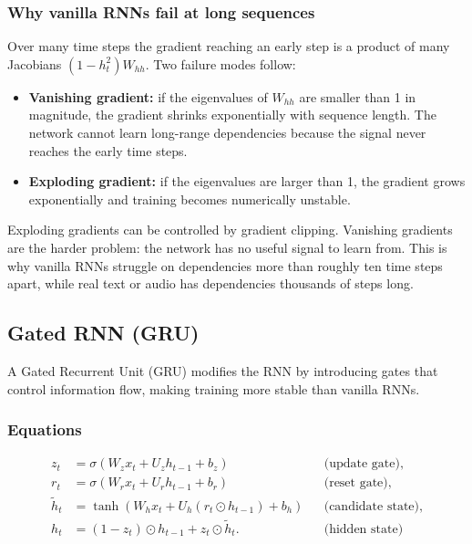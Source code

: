 \documentclass[11pt]{article}
\theoremstyle{remark}
\begin{document}
\subsubsection*{Why vanilla RNNs fail at long sequences}
Over many time steps the gradient reaching an early step is a product of many Jacobians $(1-h_t^2) W_{hh}$. Two failure modes follow:
\begin{itemize}
    \item \textbf{Vanishing gradient:} if the eigenvalues of $W_{hh}$ are smaller than 1 in magnitude, the gradient shrinks exponentially with sequence length. The network cannot learn long-range dependencies because the signal never reaches the early time steps.
    \item \textbf{Exploding gradient:} if the eigenvalues are larger than 1, the gradient grows exponentially and training becomes numerically unstable.
\end{itemize}
Exploding gradients can be controlled by gradient clipping. Vanishing gradients are the harder problem: the network has no useful signal to learn from. This is why vanilla RNNs struggle on dependencies more than roughly ten time steps apart, while real text or audio has dependencies thousands of steps long.

\subsection{Gated RNN (GRU)}
A Gated Recurrent Unit (GRU) modifies the RNN by introducing gates that control information flow, making training more stable than vanilla RNNs.

\subsubsection*{Equations}
\begin{align}
    z_t &= \sigma(W_z x_t + U_z h_{t-1} + b_z) && \text{(update gate)}, \\
    r_t &= \sigma(W_r x_t + U_r h_{t-1} + b_r) && \text{(reset gate)}, \\
    \tilde{h}_t &= \tanh(W_h x_t + U_h(r_t \odot h_{t-1}) + b_h) && \text{(candidate state)}, \\
    h_t &= (1-z_t) \odot h_{t-1} + z_t \odot \tilde{h}_t. && \text{(hidden state)}
\end{align}
\end{document}
